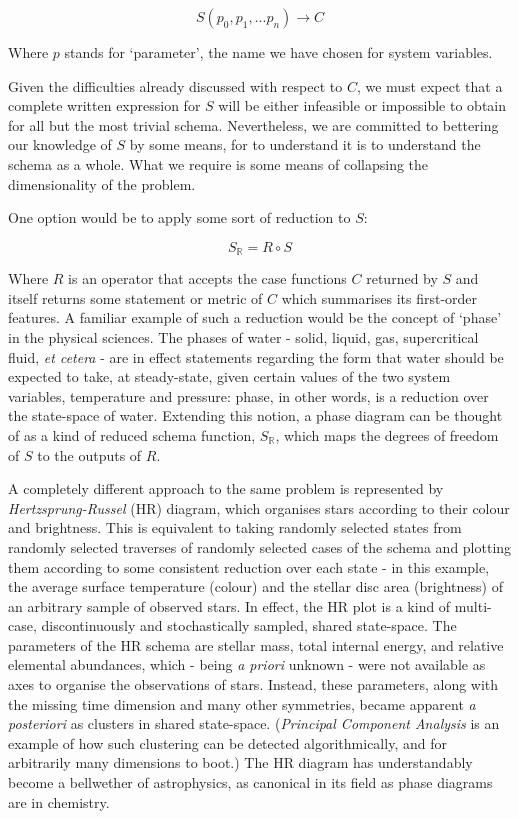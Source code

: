 \documentclass[a4paper,11pt,oneside]{book}
\begin{document}
\begin{equation}
S \left( p_0, p_1, ... p_n \right) \to C
\end{equation}

Where $p$ stands for `parameter', the name we have chosen for system variables.

Given the difficulties already discussed with respect to $C$, we must expect that a complete written expression for $S$ will be either infeasible or impossible to obtain for all but the most trivial schema. Nevertheless, we are committed to bettering our knowledge of $S$ by some means, for to understand it is to understand the schema as a whole. What we require is some means of collapsing the dimensionality of the problem.

One option would be to apply some sort of reduction to $S$:

\begin{equation}
S_{\mathbb{R}} = R \circ S
\end{equation}

Where $R$ is an operator that accepts the case functions $C$ returned by $S$ and itself returns some statement or metric of $C$ which summarises its first-order features. A familiar example of such a reduction would be the concept of `phase' in the physical sciences. The phases of water - solid, liquid, gas, supercritical fluid, \textit{et cetera} - are in effect statements regarding the form that water should be expected to take, at steady-state, given certain values of the two system variables, temperature and pressure: phase, in other words, is a reduction over the state-space of water. Extending this notion, a phase diagram can be thought of as a kind of reduced schema function, $S_{\mathbb{R}}$, which maps the degrees of freedom of $S$ to the outputs of $R$.

A completely different approach to the same problem is represented by \textit{Hertzsprung-Russel} (HR) diagram, which organises stars according to their colour and brightness. This is equivalent to taking randomly selected states from randomly selected traverses of randomly selected cases of the schema and plotting them according to some consistent reduction over each state - in this example, the average surface temperature (colour) and the stellar disc area (brightness) of an arbitrary sample of observed stars. In effect, the HR plot is a kind of multi-case, discontinuously and stochastically sampled, shared state-space. The parameters of the HR schema are stellar mass, total internal energy, and relative elemental abundances, which - being \textit{a priori} unknown - were not available as axes to organise the observations of stars. Instead, these parameters, along with the missing time dimension and many other symmetries, became apparent \textit{a posteriori} as clusters in shared state-space. (\textit{Principal Component Analysis} is an example of how such clustering can be detected algorithmically, and for arbitrarily many dimensions to boot.) The HR diagram has understandably become a bellwether of astrophysics, as canonical in its field as phase diagrams are in chemistry.
\end{document}

